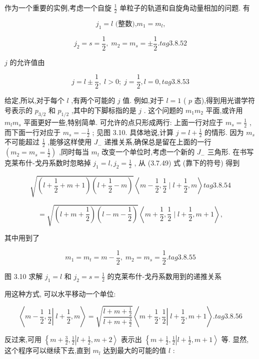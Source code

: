 作为一个重要的实例,考虑一个自旋 $\frac{1}{2}$ 单粒子的轨道和自旋角动量相加的问题. 有

$$
{j}_{1} = l\text{ (整数),}{m}_{1} = {m}_{l}\text{,}
$$

$$
{j}_{2} = s = \frac{1}{2},\;{m}_{2} = {m}_{s} = \pm \frac{1}{2}. tag{3. 8.52}
$$

$j$ 的允许值由

$$
j = l \pm \frac{1}{2},\;l > 0;\;j = \frac{1}{2}, l = 0, tag{3. 8.53}
$$

给定,所以,对于每个 $l$ ,有两个可能的 $j$ 值. 例如,对于 $l = 1$ ( $p$ 态),得到用光谱学符号表示的 ${p}_{3/2}$ 和 ${p}_{1/2}$ ,其中的下脚标指的是 $j$ . 这个问题的 ${m}_{1}{m}_{2}$ 平面,或许用 ${m}_{l}{m}_{s}$ 平面更好一些,特别简单. 可允许的点只形成两行: 上面一行对应于 ${m}_{s} = \frac{1}{2}$ ,而下面一行对应于 ${m}_{s} = - \frac{1}{2}$ ; 见图 3.10. 具体地说,计算 $j = l + \frac{1}{2}$ 的情形. 因为 ${m}_{s}$ 不可能超过 $\frac{1}{2}$ ,能够这样使用 ${J}_{ - }$ 递推关系,确保总是留在上面的一行 $\left( {{m}_{2} = {m}_{s} = \frac{1}{2}}\right)$ ,同时每当 ${m}_{l}$ 改变一个单位时,考虑一个新的 ${J}_{ - }$ 三角形. 在书写克莱布什-戈丹系数时忽略掉 ${j}_{1} = l,{j}_{2} = \frac{1}{2}$ , 从 (3.7.49) 式 (靠下的符号) 得到

$$
\sqrt{\left( {l + \frac{1}{2} + m + 1}\right) \left( {l + \frac{1}{2} - m}\right) }\left\langle {m - \frac{1}{2},\frac{1}{2} \mid l + \frac{1}{2}, m}\right\rangle tag{3.8.54}
$$

$$
= \sqrt{\left( {l + m + \frac{1}{2}}\right) \left( {l - m - \frac{1}{2}}\right) }\left\langle {m + \frac{1}{2},\frac{1}{2} \mid l + \frac{1}{2}, m + 1}\right\rangle ,
$$

其中用到了

$$
{m}_{1} = {m}_{t} = m - \frac{1}{2},\;{m}_{2} = {m}_{s} = \frac{1}{2}. tag{3. 8.55}
$$


图 3.10 求解 ${j}_{1} = l$ 和 ${j}_{2} = s = \frac{1}{2}$ 的克莱布什-戈丹系数用到的递推关系

用这种方式, 可以水平移动一个单位:

$$
\left\langle {m - \frac{1}{2},\frac{1}{2}\left| {\;l + \frac{1}{2}}\right., m}\right\rangle = \sqrt{\frac{l + m + \frac{1}{2}}{l + m + \frac{3}{2}}}\left\langle {m + \frac{1}{2},\frac{1}{2}\left| {\;l + \frac{1}{2}}\right., m + 1}\right\rangle . tag{3.8.56}
$$

反过来,可用 $\left\{ {m + \frac{3}{2},\frac{1}{2}\left| {l + \frac{1}{2}, m + 2}\right\rangle }\right.$ 表示出 $\left\{ {m + \frac{1}{2},\frac{1}{2}\left| {l + \frac{1}{2}, m + 1}\right\rangle }\right.$ 等. 显然, 这个程序可以继续下去,直到 ${m}_{l}$ 达到最大的可能的值 $l$ :

